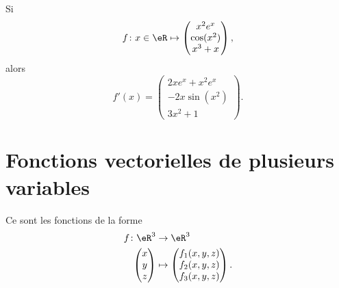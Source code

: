 \begin{example}
    Si
    \begin{equation}
        f\colon x\in\eR\mapsto \begin{pmatrix}
            x^2 e^{x}    \\ 
            \cos(x^2)    \\ 
            x^3+x    
        \end{pmatrix},
    \end{equation}
    alors
    \begin{equation}
        f'(x)=\begin{pmatrix}
            2xe^x+x^2e^x    \\ 
            -2x\sin(x^2)    \\ 
            3x^2+1    
        \end{pmatrix}.
    \end{equation}
\end{example}

\section{Fonctions vectorielles de plusieurs variables}

Ce sont les fonctions de la forme
\begin{equation}
    \begin{aligned}
        f\colon \eR^3&\to \eR^3 \\
        \begin{pmatrix}
            x    \\ 
            y    \\ 
            z    
        \end{pmatrix}&\mapsto \begin{pmatrix}
            f_1(x,y,z)\\
            f_2(x,y,z)\\
            f_3(x,y,z)
        \end{pmatrix}.
    \end{aligned}
\end{equation}


